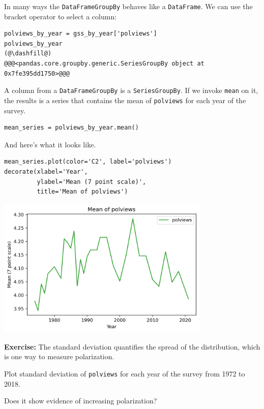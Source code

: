 In many ways the \passthrough{\lstinline!DataFrameGroupBy!} behaves like
a \passthrough{\lstinline!DataFrame!}. We can use the bracket operator
to select a column:

\begin{lstlisting}[]
polviews_by_year = gss_by_year['polviews']
polviews_by_year
(@\dashfill@)
@@@<pandas.core.groupby.generic.SeriesGroupBy object at 0x7fe395dd1750>@@@
\end{lstlisting}

A column from a \passthrough{\lstinline!DataFrameGroupBy!} is a
\passthrough{\lstinline!SeriesGroupBy!}. If we invoke
\passthrough{\lstinline!mean!} on it, the results is a series that
contains the mean of \passthrough{\lstinline!polviews!} for each year of
the survey.

\begin{lstlisting}[]
mean_series = polviews_by_year.mean()
\end{lstlisting}

And here's what it looks like.

\begin{lstlisting}[]
mean_series.plot(color='C2', label='polviews')
decorate(xlabel='Year', 
         ylabel='Mean (7 point scale)',
         title='Mean of polviews')
\end{lstlisting}

\begin{center}
\includegraphics[width=4in]{chapters/02_polviews_files/02_polviews_46_0.png}
\end{center}

\textbf{Exercise:} The standard deviation quantifies the spread of the
distribution, which is one way to measure polarization.

Plot standard deviation of \passthrough{\lstinline!polviews!} for each
year of the survey from 1972 to 2018.

Does it show evidence of increasing polarization?

